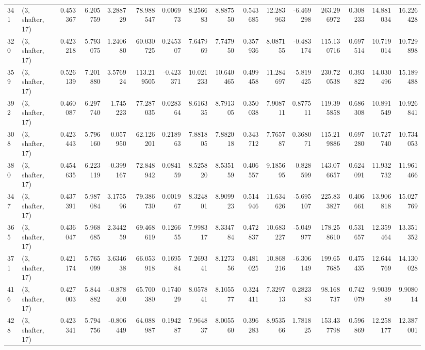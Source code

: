 \begin{tabular}{llrrrrrrrrrrrrrr}
341 &  (3, shafter, 17) &   0.453367 &   6.205759 &   3.288729 &    78.988547 &   0.006973 &   8.256683 &   8.887550 &  0.543685 &  12.283963 &  -6.469298 &   263.296972 &  0.308233 &  14.881034 &  16.226428 \\
320 &  (3, shafter, 17) &   0.423218 &   5.793075 &   1.240680 &    60.030725 &   0.245307 &   7.647969 &   7.747950 &  0.357936 &   8.087155 &  -0.483174 &   115.130716 &  0.697514 &  10.719014 &  10.729898 \\
359 &  (3, shafter, 17) &   0.526139 &   7.201880 &   3.576924 &   113.219505 &  -0.423371 &  10.021233 &  10.640465 &  0.499458 &  11.284697 &  -5.819425 &   230.720538 &  0.393822 &  14.030496 &  15.189488 \\
392 &  (3, shafter, 17) &   0.460087 &   6.297740 &  -1.745223 &    77.287035 &   0.028364 &   8.616335 &   8.791305 &  0.350038 &   7.908711 &   0.877511 &   119.395858 &  0.686308 &  10.891549 &  10.926841 \\
308 &  (3, shafter, 17) &   0.423443 &   5.796160 &  -0.057950 &    62.126201 &   0.218963 &   7.881805 &   7.882018 &  0.343712 &   7.765787 &   0.368071 &   115.219886 &  0.697280 &  10.727740 &  10.734053 \\
380 &  (3, shafter, 17) &   0.454635 &   6.223119 &  -0.399167 &    72.848942 &   0.084159 &   8.525820 &   8.535159 &  0.406557 &   9.185695 &  -0.828599 &   143.076657 &  0.624091 &  11.932732 &  11.961466 \\
347 &  (3, shafter, 17) &   0.437391 &   5.987084 &   3.175596 &    79.386730 &   0.001967 &   8.324801 &   8.909923 &  0.514946 &  11.634626 &  -5.695107 &   225.833827 &  0.406661 &  13.906818 &  15.027769 \\
365 &  (3, shafter, 17) &   0.436047 &   5.968685 &   2.344259 &    69.468619 &   0.126655 &   7.998317 &   8.334784 &  0.472837 &  10.683227 &  -5.049977 &   178.258610 &  0.531657 &  12.359464 &  13.351352 \\
371 &  (3, shafter, 17) &   0.421174 &   5.765099 &   3.634638 &    66.053918 &   0.169584 &   7.269341 &   8.127356 &  0.481025 &  10.868216 &  -6.306149 &   199.657685 &  0.475435 &  12.644769 &  14.130028 \\
416 &  (3, shafter, 17) &   0.427003 &   5.844882 &  -0.878400 &    65.700380 &   0.174029 &   8.057841 &   8.105577 &  0.324411 &   7.329713 &   0.282383 &    98.168737 &  0.742079 &   9.903989 &   9.908014 \\
428 &  (3, shafter, 17) &   0.423341 &   5.794756 &  -0.806449 &    64.088987 &   0.194287 &   7.964837 &   8.005560 &  0.396283 &   8.953566 &   1.781825 &   153.437798 &  0.596869 &  12.258177 &  12.387001 \\

\end{tabular}
